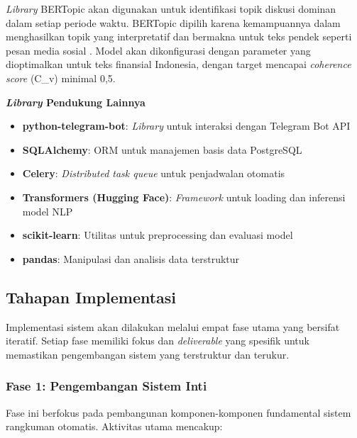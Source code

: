 \textit{Library} BERTopic akan digunakan untuk identifikasi topik diskusi dominan dalam setiap periode waktu. BERTopic dipilih karena kemampuannya dalam menghasilkan topik yang interpretatif dan bermakna untuk teks pendek seperti pesan media sosial \autocite{grootendorst2022}. Model akan dikonfigurasi dengan parameter yang dioptimalkan untuk teks finansial Indonesia, dengan target mencapai \textit{coherence score} (C\_v) minimal 0,5.

\textbf{\textit{Library} Pendukung Lainnya}

\begin{itemize}
\item \textbf{python-telegram-bot}: \textit{Library} untuk interaksi dengan Telegram Bot API
\item \textbf{SQLAlchemy}: ORM untuk manajemen basis data PostgreSQL
\item \textbf{Celery}: \textit{Distributed task queue} untuk penjadwalan otomatis
\item \textbf{Transformers (Hugging Face)}: \textit{Framework} untuk loading dan inferensi model NLP
\item \textbf{scikit-learn}: Utilitas untuk preprocessing dan evaluasi model
\item \textbf{pandas}: Manipulasi dan analisis data terstruktur
\end{itemize}

\subsection{Tahapan Implementasi}

Implementasi sistem akan dilakukan melalui empat fase utama yang bersifat iteratif. Setiap fase memiliki fokus dan \textit{deliverable} yang spesifik untuk memastikan pengembangan sistem yang terstruktur dan terukur.

\subsubsection{Fase 1: Pengembangan Sistem Inti}

Fase ini berfokus pada pembangunan komponen-komponen fundamental sistem rangkuman otomatis. Aktivitas utama mencakup:

